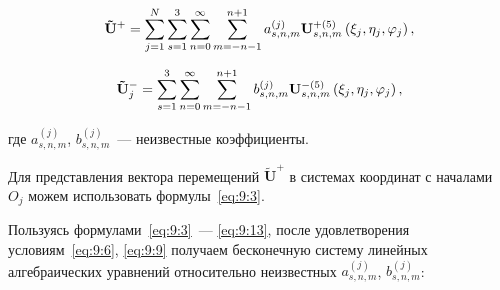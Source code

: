 \begin{equation}
{{\bf{\tilde U}}^ + } = \mathop \sum \limits_{j = 1}^N \sum\limits_{s = 1}^3 {\sum\limits_{n = 0}^\infty  {\sum\limits_{m =  - n - 1}^{n + 1} {a_{s,n,m}^{(j)}} } } {\bf{U}}_{s,n,m}^{ + (5)}\left( {{\xi _j},{\eta _j},{\varphi _j}} \right),
\end{equation}

\begin{equation}
{\bf{\tilde U}}_j^ -  = \sum\limits_{s = 1}^3 {\sum\limits_{n = 0}^\infty  {\sum\limits_{m =  - n - 1}^{n + 1} {b_{s,n,m}^{(j)}} } } {\bf{U}}_{s,n,m}^{ - (5)}\left( {{\xi _j},{\eta _j},{\varphi _j}} \right),
\end{equation}

\noindent где $a_{s,n,m}^{(j)}$, $b_{s,n,m}^{(j)}$~--- неизвестные коэффициенты.

Для представления вектора перемещений $\mathbf{\tilde U}^+$ в системах координат с началами $O_j$ можем использовать формулы~\eqref{eq:9:3}.

Пользуясь формулами~\eqref{eq:9:3}~--- \eqref{eq:9:13}, после удовлетворения условиям~\eqref{eq:9:6}, \eqref{eq:9:9} получаем бесконечную систему линейных алгебраических уравнений относительно неизвестных $a_{s,n,m}^{(j)}$, $b_{s,n,m}^{(j)}$:

